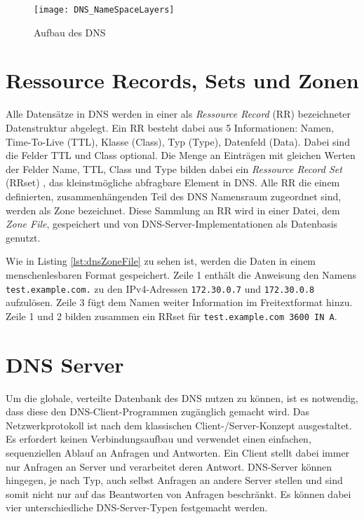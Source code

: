 \begin{figure}[!hb]
    \centering
    \texttt{[image: DNS\_NameSpaceLayers]}
    \caption{Aufbau des DNS}
    \label{img:dnsnamespace}
\end{figure}

\section{Ressource Records, Sets und Zonen}

Alle Datensätze in DNS werden in einer als \textit{Ressource Record} (RR) bezeichneter Datenstruktur abgelegt. Ein RR besteht dabei aus 5 Informationen: Namen, Time-To-Live (TTL), Klasse (Class), Typ (Type), Datenfeld (Data). Dabei sind die Felder TTL und Class optional. Die Menge an Einträgen mit gleichen Werten der Felder Name, TTL, Class und Type bilden dabei ein \textit{Ressource Record Set} (RRset) \cite{rfc2181}, das kleinstmögliche abfragbare Element in DNS. Alle RR die einem definierten, zusammenhängenden Teil des DNS Namensraum zugeordnet sind, werden als Zone bezeichnet. Diese Sammlung an RR wird in einer Datei, dem \textit{Zone File}, gespeichert und von DNS-Server-Implementationen als Datenbasis genutzt.   

Wie in Listing \ref{lst:dnsZoneFile} zu sehen ist, werden die Daten in einem menschenlesbaren Format gespeichert. Zeile 1 enthält die Anweisung den Namens \texttt{test.example.com.} zu den IPv4-Adressen \texttt{172.30.0.7} und \texttt{172.30.0.8} aufzulösen. Zeile 3 fügt dem Namen weiter Information im Freitextformat hinzu. Zeile 1 und 2 bilden zusammen ein RRset für \texttt{test.example.com 3600 IN A}.



\section{DNS Server}
\label{sec:dnsserver}

Um die globale, verteilte Datenbank des DNS nutzen zu können, ist es notwendig, dass diese den DNS-Client-Programmen zugänglich gemacht wird. Das Netzwerkprotokoll ist nach dem klassischen Client-/Server-Konzept ausgestaltet. Es erfordert keinen Verbindungsaufbau und verwendet einen einfachen, sequenziellen Ablauf an Anfragen und Antworten. Ein Client stellt dabei immer nur Anfragen an Server und verarbeitet deren Antwort. DNS-Server können hingegen, je nach Typ, auch selbst Anfragen an andere Server stellen und sind somit nicht nur auf das Beantworten von Anfragen beschränkt. Es können dabei vier unterschiedliche DNS-Server-Typen festgemacht werden.

